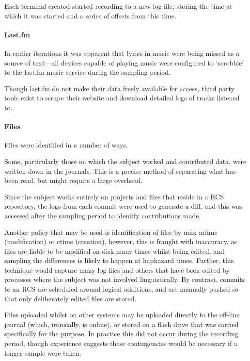 Each terminal created started recording to a new log file, storing the time at which it was started and a series of offsets from this time.

\paragraph{Last.fm}
In earlier iterations it was apparent that lyrics in music were being missed as a source of text---all devices capable of playing music were configured to `scrobble' to the last.fm music service during the sampling period.

Though last.fm do not make their data freely available for access, third party tools exist to scrape their website and download detailed logs of tracks listened to.

\paragraph{Files}
Files were identified in a number of ways.

Some, particularly those on which the subject worked and contributed data, were written down in the journals.  This is a precise method of separating what has been read, but might require a large overhead.

Since the subject works entirely on projects and files that reside in a RCS repository, the logs from each commit were used to generate a diff, and this was accessed after the sampling period to identify contributions made.

Another policy that may be used is identification of files by unix mtime (modification) or ctime (creation), however, this is fraught with inaccuracy, as files are liable to be modified on disk many times whilst being edited, and sampling the differences is likely to happen at haphazard times.  Further, this technique would capture many log files and others that have been edited by processes where the subject was not involved linguistically.  By contrast, commits to an RCS are scheduled around logical additions, and are manually pushed so that only deliberately edited files are stored.

Files uploaded whilst on other systems may be uploaded directly to the off-line journal (which, ironically, is online), or stored on a flash drive that was carried specifically for the purpose.  In practice this did not occur during the recording period, though experience suggests these contingencies would be necessary if a longer sample were taken.

